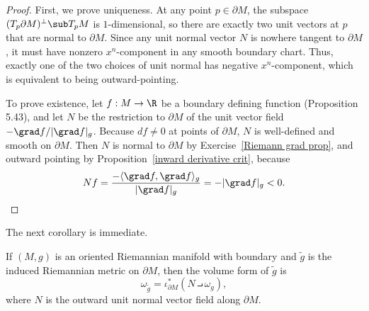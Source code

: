 \begin{proof}
First, we prove uniqueness. At any point $p\in\partial M$, the subspace $(T_p\partial M)^\bot\sub T_pM$ is $1$-dimensional, so there are exactly two unit vectors at $p$ that are normal to $\partial M$. Since any unit normal vector $N$ is nowhere tangent to $\partial M$, it must have nonzero $x^n$-component in any smooth boundary chart. Thus, exactly one of the two choices of unit normal has negative $x^n$-component, which is equivalent to being outward-pointing.\par
To prove existence, let $f:M\to\R$ be a boundary defining function (Proposition
5.43), and let $N$ be the restriction to $\partial M$ of the unit vector field $-\grad f/|\grad f|_g$. Because $df\neq0$ at points of $\partial M$, $N$ is well-defined and
smooth on $\partial M$. Then $N$ is normal to $\partial M$ by Exercise~\ref{Riemann grad prop}, and outward pointing by Proposition~\ref{inward derivative crit}, because 
\[Nf=\frac{-\langle\grad f,\grad f\rangle_g}{|\grad f|_g}=-|\grad f|_g<0.\]
\end{proof}
The next corollary is immediate.
\begin{corollary}
If $(M,g)$ is an oriented Riemannian manifold with boundary and $\widetilde{g}$ is the induced Riemannian metric on $\partial M$, then the volume form of $\widetilde{g}$ is
\[\omega_{\widetilde{g}}=\iota_{\partial M}^*(N\intprod\omega_g),\]
where $N$ is the outward unit normal vector field along $\partial M$.
\end{corollary}
